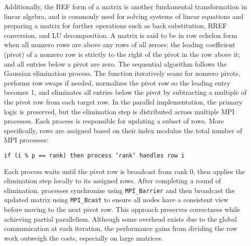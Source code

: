 \documentclass[12pt]{article}
\begin{document}
Additionally, the REF form of a matrix is another fundamental transformation in linear algebra, and is commonly used for solving systems of linear equations and preparing a matrix for further operations such as back substitution, RREF conversion, and LU decomposition. A matrix is said to be in row echelon form when all nonzero rows are above any rows of all zeroes; the leading coefficient (pivot) of a nonzero row is strictly to the right of the pivot in the row above it; and all entries below a pivot are zero. The sequential algorithm follows the Gaussian elimination process. The function iteratively scans for nonzero pivots, performs row swaps if needed, normalizes the pivot row so the leading entry becomes 1, and eliminates all entries below the pivot by subtracting a multiple of the pivot row from each target row. In the parallel implementation, the primary logic is preserved, but the elimination step is distributed across multiple MPI processes. Each process is responsible for updating a subset of rows. More specifically, rows are assigned based on their index modulus the total number of MPI processes:

\texttt{if (i \% p == rank) then process `rank` handles row i}

Each process waits until the pivot row is broadcast from rank 0, then applies the elimination step locally to its assigned rows. After completing a round of elimination, processes synchronize using \texttt{MPI\_Barrier} and then broadcast the updated matrix using \texttt{MPI\_Bcast} to ensure all nodes have a consistent view before moving to the next pivot row. This approach preserves correctness while achieving partial parallelism. Although some overhead exists due to the global communication at each iteration, the performance gains from dividing the row work outweigh the costs, especially on large matrices.
\end{document}
